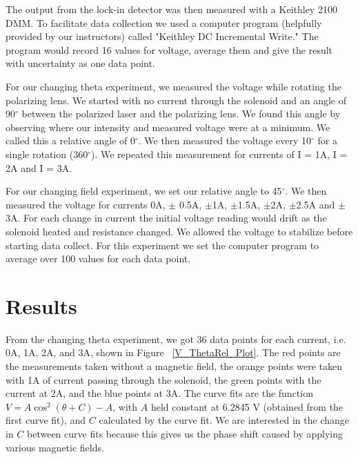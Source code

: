 \documentclass[prb,preprint]{revtex4-1}
\begin{document}
The output from the lock-in detector was then measured with a Keithley 2100 DMM. To facilitate data collection we used a computer program (helpfully provided by our instructors) called "Keithley DC Incremental Write." The program would record 16 values for voltage, average them and give the result with uncertainty as one data point. 

For our changing theta experiment, we measured the voltage while rotating the polarizing lens. We started with no current through the solenoid and an angle of 90$^{\circ}$ between the polarized laser and the polarizing lens. We found this angle by observing where our intensity and measured voltage were at a minimum. We called this a relative angle of 0$^{\circ}$. We then measured the voltage every 10$^{\circ}$ for a single rotation (360$^{\circ}$). We repeated this measurement for currents of I = 1A, I = 2A and I = 3A.

For our changing field experiment, we set our relative angle to 45$^{\circ}$. We then measured the voltage for currents 0A, $\pm$ 0.5A, $\pm$1A, $\pm$1.5A, $\pm$2A, $\pm$2.5A and $\pm$3A. For each change in current the initial voltage reading would drift as the solenoid heated and resistance changed. We allowed the voltage to stabilize before starting data collect. For this experiment we set the computer program to average over 100 values for each data point.

\section{Results}

From the changing theta experiment, we got 36 data points for each current, i.e. 0A, 1A, 2A, and 3A, shown in Figure ~\ref{V_ThetaRel_Plot}. The red points are the measurements taken without a magnetic field, the orange points were taken with 1A of current passing through the solenoid, the green points with the current at 2A, and the blue points at 3A.  The curve fits are the function $V = A \cos^{2}(\theta + C) - A$, with $A$ held constant at 6.2845 V (obtained from the first curve fit), and $C$ calculated by the curve fit. We are interested in the change in $C$ between curve fits because this gives us the phase shift caused by applying various magnetic fields.
\end{document}
